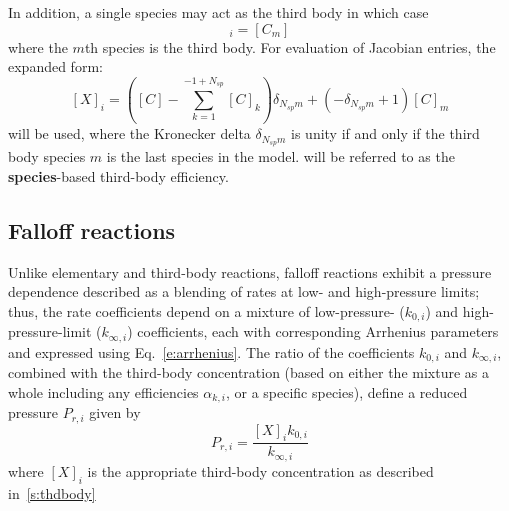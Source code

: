 \documentclass[12pt]{article}
\newcommand{\ns}{N_{sp}}
\begin{document}
In addition, a single species may act as the third body in which case
\begin{equation}
 [X]_{i} = [C_m]
\end{equation}
where the $m$th species is the third body.
For evaluation of Jacobian entries, the expanded form:
\begin{equation}
\label{e:thd_spec}
 [X]_{i}=\left([C] - \sum_{k=1}^{-1 + \ns} [C]_{k}\right) \delta_{\ns m} + \left(- \delta_{\ns m} + 1\right) [C]_{m}
\end{equation}
will be used, where the Kronecker delta $\delta_{\ns m}$ is unity if and only if the third body species $m$ is the last species in the model.
 will be referred to as the \textbf{species}-based third-body efficiency.


\subsection{Falloff reactions}
Unlike elementary and third-body reactions, falloff reactions exhibit a pressure dependence described as a blending of rates at low- and high-pressure limits; thus, the rate coefficients depend on a mixture of low-pressure- ($k_{0, i}$) and high-pressure-limit ($k_{\infty,i}$) coefficients, each with corresponding Arrhenius parameters and expressed using Eq.~\cref{e:arrhenius}.
The ratio of the coefficients $k_{0, i}$ and $k_{\infty, i}$, combined with the third-body concentration (based on either the mixture as a whole including any efficiencies $\alpha_{k,i}$, or a specific species), define a reduced pressure $P_{r,i}$ given by
\begin{equation}
 \label{e:pr}
 P_{r, i}=\frac{[X]_{i} k_{0, i}}{k_{\infty, i}}
\end{equation}
where $[X]_{i}$ is the appropriate third-body concentration as described in~\cref{s:thdbody}
\end{document}
